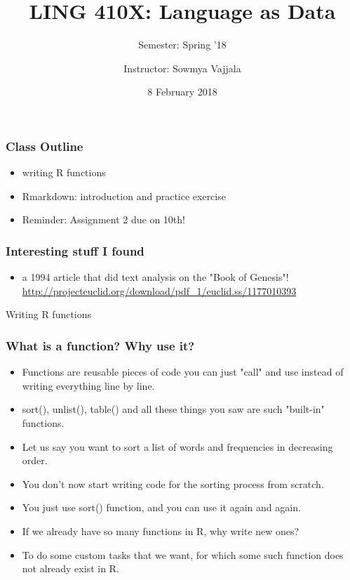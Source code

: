 \documentclass{beamer}
\author[Sowmya Vajjala]{Instructor: Sowmya Vajjala}
\title[LING 410X]{LING 410X: Language as Data}
\subtitle{Semester: Spring '18}
\date{8 February 2018}
\institute{Iowa State University, USA}
\begin{document}
\begin{frame}\titlepage
\end{frame}


\begin{frame}
\frametitle{Class Outline}
\begin{itemize}
\item writing R functions
\item Rmarkdown: introduction and practice exercise
\item Reminder: Assignment 2 due on 10th!
\end{itemize}
\end{frame}

\begin{frame}
\frametitle{Interesting stuff I found}
\begin{itemize}
\item a 1994 article that did text analysis on the "Book of Genesis"! \\ 
\url{http://projecteuclid.org/download/pdf_1/euclid.ss/1177010393}
\end{itemize}
\end{frame}

\begin{frame}
\Large Writing R functions
\end{frame}

\begin{frame}
\frametitle{What is a function? Why use it?}
\begin{itemize}
\item Functions are reusable pieces of code you can just "call" and use instead of writing everything line by line.
\item sort(), unlist(), table() and all these things you saw are such "built-in" functions. \pause
\item Let us say you want to sort a list of words and frequencies in decreasing order. 
\item You don't now start writing code for the sorting process from scratch. 
\item You just use sort() function, and you can use it again and again. 
\item If we already have so many functions in R, why write new ones? \pause
\item To do some custom tasks that we want, for which some such function does not already exist in R.
\end{itemize}
\end{frame}
\end{document}
